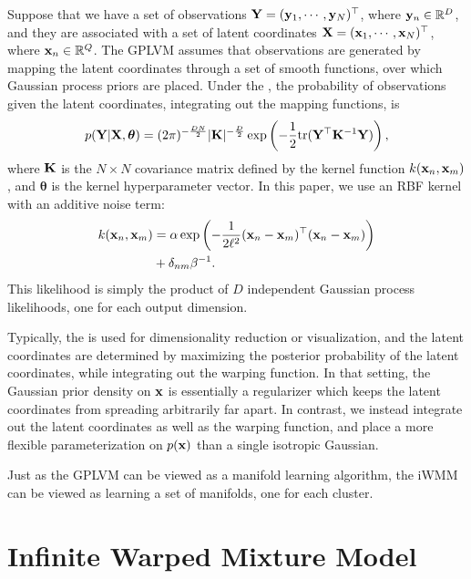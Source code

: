 Suppose that we have a set of observations
$\mathbf{Y} = ({\bf{y}}_{1},\cdots,{\bf{y}}_{N})^{\top}$,
where ${\bf{y}}_{n}\in{\mathbb R}^{D}$,
and they are associated with a set of latent coordinates
$\mathbf{X} = ({\bf{x}}_{1},\cdots,{\bf{x}}_{N})^{\top}$,
where ${\bf{x}}_{n}\in{\mathbb R}^{Q}$.
The GPLVM assumes that observations are generated by mapping the latent coordinates through a set of smooth functions, over which Gaussian process priors are placed.
Under the \gplvm{}, the probability of observations given the latent coordinates, integrating out the mapping functions, is
\begin{align}
p(\mathbf{Y} | \mathbf{X},\bm{\theta})  = (2 \pi)^{-\frac{DN}{2}}  |\mathbf{K}|^{-\frac{D}{2}} \exp \left( -\frac{1}{2} {\rm tr}( \mathbf{Y}^{\top} \mathbf{K}^{-1} \mathbf{Y}) \right),
\label{eq:py_x}
\end{align}
where $\mathbf{K}$ is the $N \times N$ covariance matrix defined 
by the kernel function $k({\bf{x}}_{n},{\bf{x}}_{m})$,
and $\bm{\theta}$ is the kernel hyperparameter vector.
In this paper, we use an RBF kernel with an additive noise term:
\begin{align}
k({\bf{x}}_{n},{\bf{x}}_{m}) &= \alpha \exp\left( - \frac{1}{2 \ell^2}({\bf{x}}_n - {\bf{x}}_m)^{\top} ({\bf{x}}_n - {\bf{x}}_m) \right) \nonumber \\
&+ \delta_{nm} \beta^{-1}.
\end{align}
This likelihood is simply the product of $D$ independent Gaussian process likelihoods, one for each output dimension.

Typically, the \gplvm{} is used for dimensionality reduction or visualization, and the latent coordinates are determined by maximizing the posterior probability of the latent coordinates, while integrating out the warping function.  
In that setting, the Gaussian prior density on ${\bf{x}}$ is essentially a regularizer which keeps the latent coordinates from spreading arbitrarily far apart.  
In contrast, we instead integrate out the latent coordinates as well as the warping function, and place a more flexible parameterization on $p({\bf{x}})$ than a single isotropic Gaussian.

Just as the GPLVM can be viewed as a manifold learning algorithm, the iWMM can be viewed as learning a set of manifolds, one for each cluster.





\section{Infinite Warped Mixture Model}

